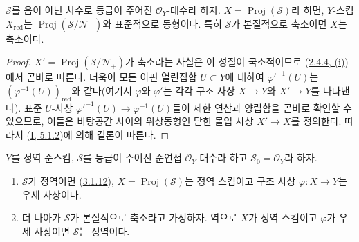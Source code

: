 \begin{proposition}[3.1.13]
\label{II.3.1.13-ko}
$\mathcal{S}$를 음이 아닌 차수로 등급이 주어진 $\mathcal{O}_Y$-대수라
하자. $X=\operatorname{Proj}(\mathcal{S})$라 하면, $Y$-스킴
$X_{\mathrm{red}}$는 $\operatorname{Proj}(\mathcal{S}/\mathcal{N}_+)$와
표준적으로 동형이다. 특히 $\mathcal{S}$가 본질적으로 축소이면 $X$는
축소이다.
\end{proposition}

\begin{proof}
$X'=\operatorname{Proj}(\mathcal{S}/\mathcal{N}_+)$가 축소라는 사실은 이
성질이 국소적이므로 (\hyperref[II.2.4.4-ko]{2.4.4, (i)})에서 곧바로
따른다. 더욱이 모든 아핀 열린집합 $U\subset Y$에 대하여
${\varphi'}^{-1}(U)$는 $(\varphi^{-1}(U))_{\mathrm{red}}$와 같다(여기서
$\varphi$와 $\varphi'$는 각각 구조 사상 $X\to Y$와 $X'\to Y$를
나타낸다). 표준 $U$-사상
${\varphi'}^{-1}(U)\to\varphi^{-1}(U)$들이 제한 연산과 양립함을 곧바로
확인할 수 있으므로, 이들은 바탕공간 사이의 위상동형인 닫힌 몰입 사상
$X'\to X$를 정의한다. 따라서 (\hyperref[I.5.1.2-ko]{I, 5.1.2})에 의해
결론이 따른다.
\end{proof}

\begin{proposition}[3.1.14]
\label{II.3.1.14-ko}
$Y$를 정역 준스킴, $\mathcal{S}$를 등급이 주어진 준연접
$\mathcal{O}_Y$-대수라 하고 $\mathcal{S}_0=\mathcal{O}_Y$라 하자.
\begin{enumerate}
  \item[\rm(i)] $\mathcal{S}$가 정역이면
    (\hyperref[II.3.1.12-ko]{3.1.12}),
    $X=\operatorname{Proj}(\mathcal{S})$는 정역 스킴이고 구조 사상
    $\varphi:X\to Y$는 우세 사상이다.
  \item[\rm(ii)] 더 나아가 $\mathcal{S}$가 본질적으로 축소라고
    가정하자. 역으로 $X$가 정역 스킴이고 $\varphi$가 우세 사상이면
    $\mathcal{S}$는 정역이다.
\end{enumerate}
\end{proposition}

